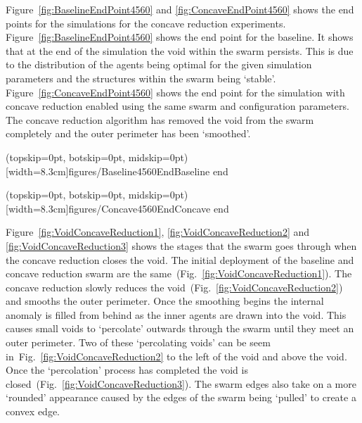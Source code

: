 \documentclass{ieeeaccess}
\begin{document}
Figure~\ref{fig:BaselineEndPoint4560} and \ref{fig:ConcaveEndPoint4560} shows the end points for the simulations for the concave reduction experiments. Figure~\ref{fig:BaselineEndPoint4560} shows the end point for the baseline. It shows that at the end of the simulation the void within the swarm persists. This is due to the distribution of the agents being optimal for the given simulation parameters and the structures within the swarm being `stable'. Figure~\ref{fig:ConcaveEndPoint4560} shows the end point for the simulation with concave reduction enabled using the same swarm and configuration parameters. The concave reduction algorithm has removed the void from the swarm completely and the outer perimeter has been `smoothed'. 

\Figure[t!](topskip=0pt, botskip=0pt, midskip=0pt)[width=8.3cm]{figures/Baseline4560End}{Baseline end\label{fig:BaselineEndPoint4560}}

\Figure[t!](topskip=0pt, botskip=0pt, midskip=0pt)[width=8.3cm]{figures/Concave4560End}{Concave end\label{fig:ConcaveEndPoint4560}}

Figure~\ref{fig:VoidConcaveReduction1}, \ref{fig:VoidConcaveReduction2} and \ref{fig:VoidConcaveReduction3} shows the stages that the swarm goes through when the concave reduction closes the void. The initial deployment of the baseline and concave reduction swarm are the same~(Fig.~\ref{fig:VoidConcaveReduction1}). The concave reduction slowly reduces the void~(Fig.~\ref{fig:VoidConcaveReduction2}) and smooths the outer perimeter. Once the smoothing begins the internal anomaly is filled from behind as the inner agents are drawn into the void. This causes small voids to `percolate' outwards through the swarm until they meet an outer perimeter. Two of these `percolating voids' can be seem in~Fig.~\ref{fig:VoidConcaveReduction2} to the left of the void and above the void. Once the `percolation' process has completed the void is closed~(Fig.~\ref{fig:VoidConcaveReduction3}). The swarm edges also take on a more `rounded' appearance caused by the edges of the swarm being `pulled' to create a convex edge.
\end{document}
